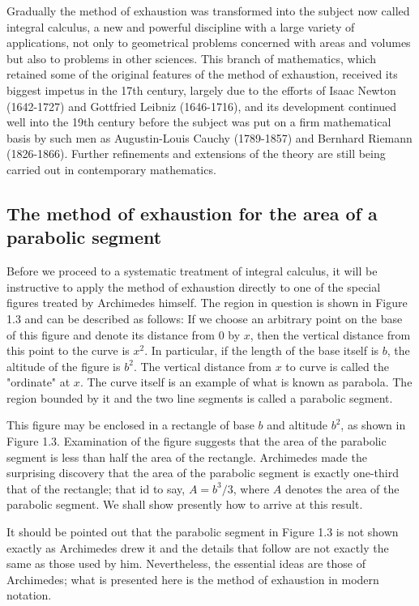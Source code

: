 \documentclass[cn,11pt,chinese]{elegantbook}
\numberwithin{equation}{section}
\begin{document}
Gradually the method of exhaustion was transformed into the subject now called integral calculus, a new and powerful discipline with a large variety of applications, not only to geometrical problems concerned with areas and volumes but also to problems in other sciences. This branch of mathematics, which retained some of the original features of the method of exhaustion, received its biggest impetus in the 17th century, largely due to the efforts of Isaac Newton (1642-1727) and Gottfried Leibniz (1646-1716), and its development continued well into the 19th century before the subject was put on a firm mathematical basis by such men as Augustin-Louis Cauchy (1789-1857) and Bernhard Riemann (1826-1866). Further refinements and extensions of the theory are still being carried out in contemporary mathematics.

\subsection{The method of exhaustion for the area of a parabolic segment}
Before we proceed to a systematic treatment of integral calculus, it will be instructive to apply the method of exhaustion directly to one of the special figures treated by Archimedes himself. The region in question is shown in Figure 1.3 and can be described as follows: If we choose an arbitrary point on the base of this figure and denote its distance from 0 by $x$, then the vertical distance from this point to the curve is $x^2$. In particular, if the length of the base itself is $b$, the altitude of the figure is $b^2$. The vertical distance from $x$ to curve is called the "ordinate" at $x$. The curve itself is an example of what is known as parabola. The region bounded by it and the two line segments is called a parabolic segment.

This figure may be enclosed in a rectangle of base $b$ and altitude $b^2$, as shown in Figure 1.3. Examination of the figure suggests that the area of the parabolic segment is less than half the area of the rectangle. Archimedes made the surprising discovery that the area of the parabolic segment is exactly one-third that of the rectangle; that id to say, $A = b^3/3$, where $A$ denotes the area of the parabolic segment. We shall show presently how to arrive at this result.

It should be pointed out that the parabolic segment in Figure 1.3 is not shown exactly as Archimedes drew it and the details that follow are not exactly the same as those used by him. Nevertheless, the essential ideas are those of Archimedes; what is presented here is the method of exhaustion in modern notation.
\end{document}
